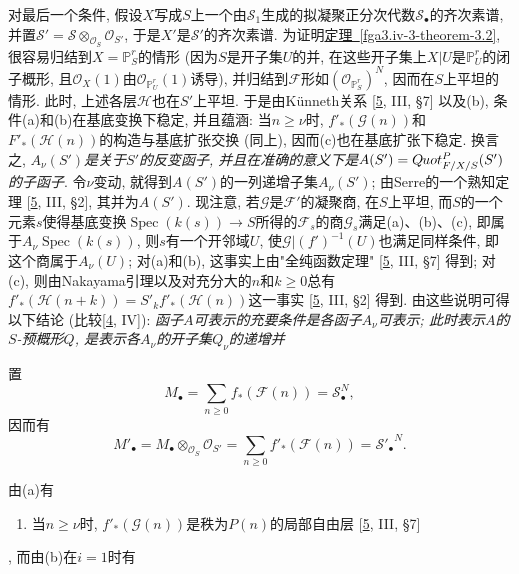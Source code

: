 \begin{enumerate}
  
\end{enumerate} 对最后一个条件, 假设\(X\)写成\(S\)上一个由\(\mathcal {S}_1\)生成的拟凝聚正分次代数\(\mathcal {S}_\bullet \)的齐次素谱, 并置\(\mathcal {S}'=\mathcal {S}\otimes _{\mathcal {O}_S}\mathcal {O}_{S'}\), 于是\(X'\)是\(\mathcal {S}'\)的齐次素谱. 为证明\hyperref[fga3.iv-3-theorem-3.2]{定理~\ref*{fga3.iv-3-theorem-3.2}}, 很容易归结到\(X=\mathbb {P}_S^r\)的情形 (因为\(S\)是开子集\(U\)的并, 在这些开子集上\(X|U\)是\(\mathbb {P}_U^r\)的闭子概形, 且\(\mathcal {O}_X(1)\)由\(\mathcal {O}_{\mathbb {P}_U^r} (1)\)诱导), 并归结到\(\mathscr {F}\)形如\((\mathcal {O}_{\mathbb {P}_S^r})^N\), 因而在\(S\)上平坦的情形. 此时, 上述各层\(\mathscr {H}\)也在\(S'\)上平坦. 于是由Künneth关系 [\hyperref[GD1960]{5}, III, §7] 以及(b), 条件(a)和(b)在基底变换下稳定, 并且蕴涵: 当\(n\geqslant \nu \)时, \(f'_*(\mathscr {G} (n))\)和\(F'_*(\mathscr {H} (n))\)的构造与基底扩张交换 (同上), 因而(c)也在基底扩张下稳定. 换言之, \emph{\(A_\nu (S')\)是关于\(S'\)的反变函子, 并且在准确的意义下是\(A(S')=\mathscr {Q}\kern  -.75pt\mathit {uot}_{{\mathscr {F}/X/S}}^P(S')\)的子函子}. 令\(\nu \)变动, 就得到\(A(S')\)的一列递增子集\(A_\nu (S')\); 由Serre的一个熟知定理 [\hyperref[GD1960]{5}, III, §2], 其并为\(A(S')\). 现注意, 若\(\mathscr {G}\)是\(\mathscr {F}'\)的凝聚商, 在\(S\)上平坦, 而\(S\)的一个元素\(s\)使得基底变换\(\operatorname {Spec}(k(s))\to  S\)所得的\(\mathscr {F}_s\)的商\(\mathscr {G}_s\)满足(a)、(b)、(c), 即属于\(A_\nu \operatorname {Spec}(k(s))\), 则\(s\)有一个开邻域\(U\), 使\(\mathscr {G}|(f')^{-1} (U)\)也满足同样条件, 即这个商属于\(A_\nu (U)\); 对(a)和(b), 这事实上由"全纯函数定理" [\hyperref[GD1960]{5}, III, §7] 得到; 对(c), 则由Nakayama引理以及对充分大的\(n\)和\(k\geqslant 0\)总有\(f'_*(\mathscr {H} (n+k))=S'_kf'_*(\mathscr {H} (n))\)这一事实 [\hyperref[GD1960]{5}, III, §2] 得到. 由这些说明可得以下结论 (比较[\hyperref[Gro1960a]{4}, IV]): \emph{函子\(A\)可表示的充要条件是各函子\(A_\nu \)可表示; 此时表示\(A\)的\(S\)-预概形\(Q\), 是表示各\(A_\nu \)的开子集\(Q_\nu \)的递增并}
\par{}置\[     M_\bullet      = \sum _{n\geqslant 0} f_*(\mathscr {F} (n))     = \mathcal {S}_\bullet ^N,\] 因而有\[     M'_\bullet      = M_\bullet \otimes _{\mathcal {O}_S}\mathcal {O}_{S'}     = \sum _{n\geqslant 0} f'_*(\mathscr {F} (n))     = {\mathcal {S}'_\bullet }^N.\]
\par{}由(a)有
\begin{enumerate}
    
 \item[a'.]当\(n\geqslant \nu \)时, \(f'_*(\mathscr {G} (n))\)是秩为\(P(n)\)的局部自由层 [\hyperref[GD1960]{5}, III, §7]

  
\end{enumerate}, 而由(b)在\(i=1\)时有
